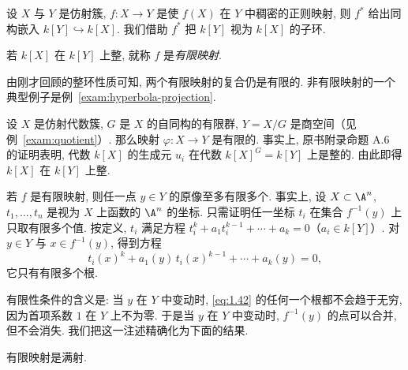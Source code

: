 设 $X$ 与 $Y$ 是仿射簇, $f: X \to Y$ 是使 $f(X)$ 在 $Y$ 中稠密的正则映射, 则 $f^*$ 给出同构嵌入 $k[Y] \hookrightarrow k[X]$. 我们借助 $f^*$ 把 $k[Y]$ 视为 $k[X]$ 的子环.

\begin{definition}[有限映射]\label{def:finite-map}
	若 $k[X]$ 在 $k[Y]$ 上整, 就称 $f$ 是\emph{有限映射}.
\end{definition}

由刚才回顾的整环性质可知, 两个有限映射的复合仍是有限的. 非有限映射的一个典型例子是例~\ref{exam:hyperbola-projection}.

\begin{example}\label{exam:quotient-finite}
	设 $X$ 是仿射代数簇, $G$ 是 $X$ 的自同构的有限群, $Y = X/G$ 是商空间（见例~\ref{exam:quotient}）. 那么映射 $\varphi: X \to Y$ 是有限的. 事实上, 原书附录命题 A.6 的证明表明, 代数 $k[X]$ 的生成元 $u_i$ 在代数 $k[X]^G = k[Y]$ 上是整的. 由此即得 $k[X]$ 在 $k[Y]$ 上整.
\end{example}

若 $f$ 是有限映射, 则任一点 $y \in Y$ 的原像至多有限多个. 事实上, 设 $X \subset \A^n$, $t_1, \ldots, t_n$ 是视为 $X$ 上函数的 $\A^n$ 的坐标. 只需证明任一坐标 $t_i$ 在集合 $f^{-1}(y)$ 上只取有限多个值. 按定义, $t_i$ 满足方程 $t_i^k + a_1 t_i^{k-1} + \cdots + a_k = 0$（$a_i \in k[Y]$）. 对 $y \in Y$ 与 $x \in f^{-1}(y)$, 得到方程
\begin{equation}
	\label{eq:1.42}
	t_i(x)^k + a_1(y)\, t_i(x)^{k-1} + \cdots + a_k(y) = 0,
\end{equation}
它只有有限多个根.

有限性条件的含义是: 当 $y$ 在 $Y$ 中变动时, \eqref{eq:1.42} 的任何一个根都不会趋于无穷, 因为首项系数 $1$ 在 $Y$ 上不为零. 于是当 $y$ 在 $Y$ 中变动时, $f^{-1}(y)$ 的点可以合并, 但不会消失. 我们把这一注述精确化为下面的结果.

\begin{theorem}\label{thm:finite-surjective}
	有限映射是满射.
\end{theorem}


